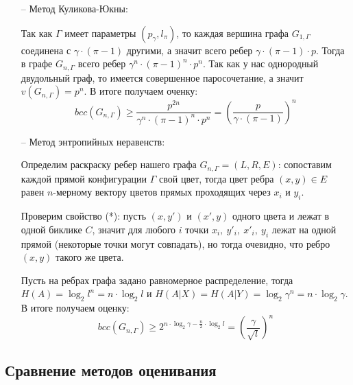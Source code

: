 \documentclass[a4paper]{article}
\newtheorem*{msolution}{Доказательство}
\begin{document}
\begin{itemize}
\begin{msolution}
        Вернемся к доказательству леммы. Так как матрица графа $G_{n, \Gamma}$ есть не что иное, как 
        Кронекерово произведение $n$ матриц графа $G_{1, \Gamma}$, то мы можем найти трудное множество 
        размера $k^n$. $\square$
     \end{msolution}
     
     В итоге мы получили, что если $\Gamma$ является аналогом полного двудольного графа, то 
     $$bcc(G_{n, \Gamma}) \geq 2^n$$ иначе $$bcc(G_{n, \Gamma}) \geq 3^n$$
     
     \item[--] Метод Куликова-Юкны:
     
     Так как $\Gamma$ имеет параметры $(p_{\gamma}, l_{\pi})$, то каждая вершина графа $G_{1,\Gamma}$ 
     соединена с $\gamma\cdot (\pi - 1)$ другими, а значит всего ребер $\gamma\cdot (\pi - 1)\cdot p$. Тогда в графе 
     $G_{n, \Gamma}$ всего ребер $\gamma^n\cdot (\pi - 1)^n\cdot p^n$. Так как у нас однородный двудольный граф, 
     то имеется совершенное паросочетание, а значит $v(G_{n, \Gamma}) = p^n$. В итоге получаем оченку:
     $$bcc(G_{n,\Gamma}) \geq \frac{p^{2n}}{\gamma^n\cdot (\pi - 1)^n\cdot p^n} = \left(\frac{p}{\gamma\cdot (\pi -1)}\right)^n$$
     
     \item[--] Метод энтропийных неравенств:
     
     Определим раскраску ребер нашего графа $G_{n,\Gamma} = (L, R, E)$: сопоставим каждой прямой 
     конфигурации $\Gamma$ свой цвет, тогда цвет ребра $(x, y)\in E$ равен $n$-мерному вектору цветов 
     прямых проходящих через $x_i$ и  $y_i$.
     
     Проверим свойство (*): пусть $(x, y')$ и $(x', y)$ одного цвета и лежат в одной биклике $C$, значит 
     для любого $i$ точки $x_i,\ y'_i,\ x'_i,\ y_i$ лежат на одной прямой (некоторые точки могут совпадать), 
     но тогда очевидно, что ребро $(x, y)$ такого же цвета. 
     
     Пусть на ребрах графа задано равномерное распределение, тогда $H(A) = \log_2l^n = n\cdot\log_2l$ и 
     $H(A|X)=H(A|Y) = \log_2\gamma^n = n\cdot\log_2\gamma$. В итоге получаем оценку: $$bcc(G_{n, \Gamma}) \geq 
     2^{n\cdot\log_2\gamma - \frac{n}{2}\cdot\log_2l} = \left(\frac{\gamma}{\sqrt{l}}\right)^n$$
     
\end{itemize}

\subsection{Сравнение методов оценивания}
\end{document}
